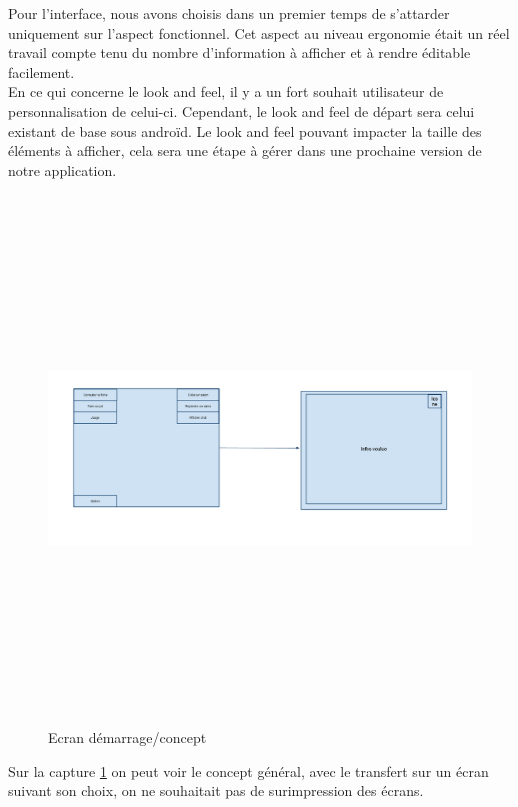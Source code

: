 \documentclass[11pt,a4paper]{article}
\begin{document}
Pour l'interface, nous avons choisis dans un premier temps de s'attarder
uniquement sur l'aspect fonctionnel. Cet aspect au niveau ergonomie
était un réel travail compte tenu du nombre d'information à afficher et à rendre
éditable facilement.\\

En ce qui concerne le look and feel, il y a un fort souhait utilisateur de
personnalisation de celui-ci. Cependant, le look and feel de départ sera celui
existant de base sous androïd. Le look and feel pouvant impacter
la taille des éléments à afficher, cela sera une étape à gérer dans une
prochaine version de notre application.\\

\begin{figure}[h]
  	
\includegraphics[height=14cm,width=15cm]{image/screen1.png}
  		\caption{Ecran démarrage/concept}
  		\label{screen1}
\end{figure}

Sur la capture \ref{screen1} on peut voir le concept général, avec le transfert
sur un écran suivant son choix, on ne souhaitait pas de surimpression des
écrans.
\end{document}
